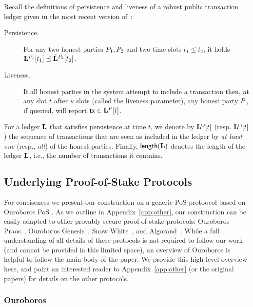 Recall the definitions of persistence and liveness of a robust public
transaction ledger given in the most recent version of~\cite{EC:GarKiaLeo15}:

\begin{description}
  \item[Persistence.]
    For any two honest parties $P_1,P_2$ and two time slots $t_1\leq t_2$,
    it holds  $\mathbf{L}^{P_1}[t_1] \preceq
    \check{\mathbf{L}}^{P_2}[t_2]$.

  \item[Liveness.]
    If all honest parties in the system attempt to include a  transaction
    then, at any slot $t$ after $u$ slots (called the
    liveness parameter), any honest party $P$, if queried,
    will report $\mathsf{tx} \in \mathbf{L}^{P}[t]$.
\end{description}

For a ledger $\mathbf{L}$ that satisfies persistence at time $t$, we denote by $\mathbf{L}^{\cup}[t]$ (resp.
$\mathbf{L}^{\cap}[t]$) the sequence of transactions that are seen as
included in the ledger by \emph{at least one} (resp., \emph{all}) of the honest
parties. Finally, $\mathsf{length}(\mathbf{L})$ denotes the length of the ledger $\mathbf{L}$,
i.e., the number of transactions it contains.


\subsection{Underlying Proof-of-Stake Protocols}
\label{sec:ouroboros}
\label{sec:pos}

For conciseness we present our construction on a generic PoS protoocol
 based on  Ouroboros PoS \cite{C:KRDO17}. As we outline
in Appendix~\ref{app:other}, our construction can  be easily adapted to other
provably secure proof-of-stake protocols: Ouroboros
Praos~\cite{EC:DGKR18}, Ouroboros Genesis~\cite{genesis}, Snow
White~\cite{DBLP:journals/iacr/BentovPS16a}, and Algorand~\cite{algorand}.
While a full understanding of all details of these protocols is not required to
follow our work (and cannot be provided in this limited space), an overview of
Ouroboros is helpful to follow the main body of the paper.  We provide this
high-level overview here, and point an interested reader to
Appendix~\ref{app:other} (or the original papers) for details on the other
protocols.

\subsubsection{Ouroboros}

